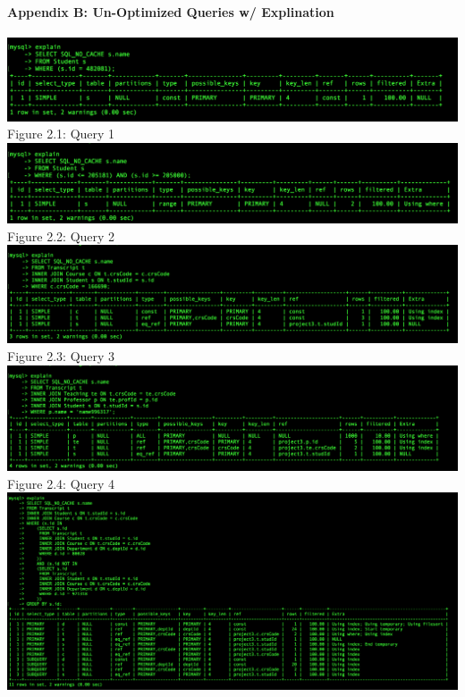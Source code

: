 \documentclass[11pt]{report}
\begin{document}
	\paragraph*{Appendix B: Un-Optimized Queries w/ Explination}
		\begin{center}
			\includegraphics[scale=0.5]{Eb1.PNG}\\
			Figure 2.1: Query 1\\
			\includegraphics[scale=0.49]{Eb2.PNG}\\
			Figure 2.2: Query 2\\
			\includegraphics[scale=0.434]{Eb3.PNG}\\
			Figure 2.3: Query 3\\
			\includegraphics[scale=0.42]{Eb4.PNG}\\
			Figure 2.4: Query 4\\
			\includegraphics[scale=0.355]{Eb5.PNG}\\

\end{center}
\end{document}

